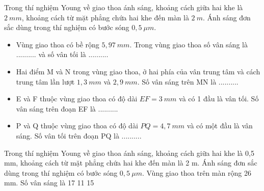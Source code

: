 \begin{vidu}
Trong thí nghiệm Young về giao thoa ánh sáng, khoảng cách giữa hai khe là $2\ mm$, khoảng cách từ mặt phẳng chứa hai khe đến màn là $2\ m$. Ánh sáng đơn sắc dùng trong thí nghiệm có bước sóng $0,5 \ \mu m$. 
\begin{itemize}
\item [1.] Vùng giao thoa có bề rộng $5,97\ mm$. Trong vùng giao thoa số vân sáng là .......... và số vân tối là ..........
\item [2.] Hai điểm M và N trong vùng giao thoa, ở hai phía của vân trung tâm và cách trung tâm lần lượt $1,3\ mm$ và $2,9\ mm$. Số vân sáng trên MN là ..........
\item [3.] E và F thuộc vùng giao thoa có độ dài $EF=3\ mm$ và có 1 đầu là vân tối. Số vân sáng trên đoạn EF là ..........
\item [4.] P và Q thuộc vùng giao thoa có độ dài $PQ=4,7\ mm$ và có một đầu là vân sáng. Số vân tối trên đoạn PQ là ..........
\end{itemize}
\end{vidu} 
\begin{vidu}%
Trong thí nghiệm Young về giao thoa ánh sáng, khoảng cách giữa hai khe là 0,5 mm, khoảng cách từ mặt phẳng chứa hai khe đến màn là 2 m. Ánh sáng đơn sắc dùng trong thí nghiệm có bước sóng $0,5 \ \mu m$. Vùng giao thoa trên màn rộng 26 mm. Số vân sáng là
\choice
{17}
{11}
{}
{15}
\end{vidu} 
